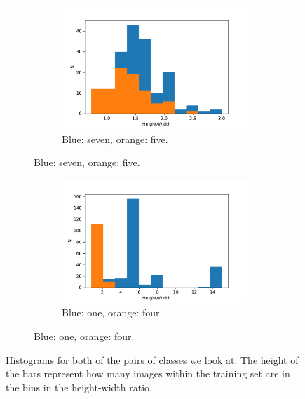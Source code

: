 \documentclass[10 pt, a4paper]{article}
\begin{document}
\begin{figure}[H] 
\begin{subfigure}[b]{0.5\textwidth}
\begin{figure}[H]
\includegraphics[width=\textwidth]{hist57}
\caption{Blue: seven, orange: five.}
\label{}
\end{figure}
\end{subfigure}
\begin{subfigure}[b]{0.5\textwidth}
\begin{figure}[H] 
\includegraphics[width=\textwidth]{hist14}
\caption{Blue: one, orange: four.}
\label{}
\end{figure}
\end{subfigure}
\caption{Histograms for both of the pairs of classes we look at. The height of the bars represent how many images within the training set are in the bins in the height-width ratio.}
\label{fig:hist}
\end{figure}
\end{document}
